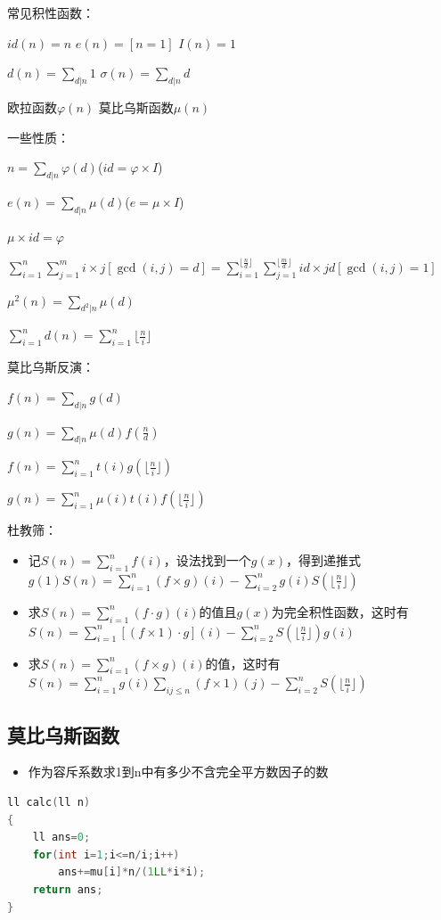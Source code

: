 \documentclass[UTF8,a4paper,titlepage]{ctexart}
\begin{document}
常见积性函数：\par
$id(n)=n$\qquad
$e(n)=[n=1]$\qquad
$I(n)=1$\par
$d(n)=\sum_{d|n}1$\qquad
$\sigma(n)=\sum_{d|n}d$\par
欧拉函数$\varphi(n)$\qquad
莫比乌斯函数$\mu(n)$\par
一些性质：\par
$n=\sum_{d|n}\varphi(d)$\qquad($id=\varphi \times I$)\par
$e(n)=\sum_{d|n}\mu(d)$\qquad($e=\mu \times I$)\par
$\mu\times id=\varphi$\par
$\sum_{i=1}^n\sum_{j=1}^m i\times j[\gcd(i,j)=d]=\sum_{i=1}^{\lfloor\frac{n}{d}\rfloor}\sum_{j=1}^{\lfloor\frac{m}{d}\rfloor} id\times jd[\gcd(i,j)=1]$\par
$\mu^2(n)=\sum_{d^2|n}\mu(d)$\par
$\sum_{i=1}^nd(n)=\sum_{i=1}^n\lfloor\frac{n}{i}\rfloor$\par
莫比乌斯反演：\par
$f(n)=\sum_{d|n}g(d)$\par
$g(n)=\sum_{d|n}\mu(d)f(\frac{n}{d})$\par
$f(n)=\sum_{i=1}^nt(i)g(\lfloor\frac{n}{i}\rfloor)$\par
$g(n)=\sum_{i=1}^n\mu(i)t(i)f(\lfloor\frac{n}{i}\rfloor)$\par
杜教筛：\par
\begin{itemize}
	\item 记$S(n)=\sum_{i=1}^{n}f(i)$，设法找到一个$g(x)$，得到递推式$g(1)S(n)=\sum_{i=1}^{n}(f\times g)(i)-\sum_{i=2}^{n}g(i)S(\lfloor\frac{n}{i}\rfloor)$
	\item 求$S(n)=\sum_{i=1}^n (f \cdot g)(i)$的值且$g(x)$为完全积性函数，这时有$S(n)=\sum_{i=1}^n[(f\times 1) \cdot g](i)-\sum_{i=2}^n S(\lfloor \frac{n}{i} \rfloor)g(i)$
	\item 求$S(n)=\sum_{i=1}^n (f\times g)(i)$的值，这时有
	      $S(n)=\sum_{i=1}^n g(i)\sum_{ij \leq n}(f\times 1)(j)-\sum_{i=2}^n S(\lfloor \frac{n}{i} \rfloor)$
\end{itemize}


\subsection{莫比乌斯函数}
\begin{itemize}
	\item 作为容斥系数求1到n中有多少不含完全平方数因子的数
\end{itemize}
\begin{lstlisting}[language=C++]
ll calc(ll n)
{
    ll ans=0;
    for(int i=1;i<=n/i;i++)
        ans+=mu[i]*n/(1LL*i*i);
    return ans;
}
\end{lstlisting}
\end{document}
